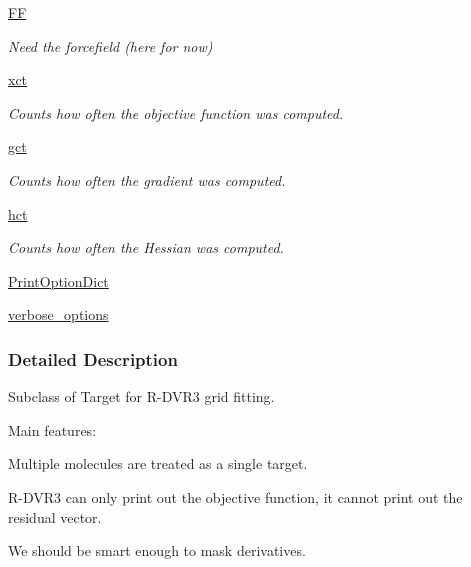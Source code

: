 \begin{DoxyCompactItemize}
\hyperlink{classforcebalance_1_1target_1_1Target_a796dc30a19a60c63fb43b088d40a963f}{\-F\-F}
\begin{DoxyCompactList}\small\item\em \-Need the forcefield (here for now) \end{DoxyCompactList}\item 
\hyperlink{classforcebalance_1_1target_1_1Target_ad4cd0ab38d8fc97d3e7a6e22ce130a16}{xct}
\begin{DoxyCompactList}\small\item\em \-Counts how often the objective function was computed. \end{DoxyCompactList}\item 
\hyperlink{classforcebalance_1_1target_1_1Target_aff6e42b84dd8eb5a4dc3b47aa58bc64c}{gct}
\begin{DoxyCompactList}\small\item\em \-Counts how often the gradient was computed. \end{DoxyCompactList}\item 
\hyperlink{classforcebalance_1_1target_1_1Target_ae929918b7e695a99d7ec946d06d793e1}{hct}
\begin{DoxyCompactList}\small\item\em \-Counts how often the \-Hessian was computed. \end{DoxyCompactList}\item 
\hyperlink{classforcebalance_1_1BaseClass_afc6659278497d7245bc492ecf405ccae}{\-Print\-Option\-Dict}
\item 
\hyperlink{classforcebalance_1_1BaseClass_afd68efa29ccd2f320f4cf82198214aac}{verbose\-\_\-options}
\end{DoxyCompactItemize}


\subsubsection{\-Detailed \-Description}
\-Subclass of \-Target for \-R-\/\-D\-V\-R3 grid fitting. 

\-Main features\-:
\begin{DoxyItemize}
\item \-Multiple molecules are treated as a single target.
\item \-R-\/\-D\-V\-R3 can only print out the objective function, it cannot print out the residual vector.
\item \-We should be smart enough to mask derivatives. 
\end{DoxyItemize}


